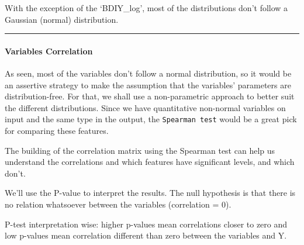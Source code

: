 \documentclass[
]{article}
\begin{document}
With the exception of the `BDIY\_log', most of the distributions don't
follow a Gaussian (normal) distribution.

\begin{center}\rule{0.5\linewidth}{0.5pt}\end{center}

\hypertarget{variables-correlation}{%
\paragraph{Variables Correlation}\label{variables-correlation}}

As seen, most of the variables don't follow a normal distribution, so it
would be an assertive strategy to make the assumption that the
variables' parameters are distribution-free. For that, we shall use a
non-parametric approach to better suit the different distributions.
Since we have quantitative non-normal variables on input and the same
type in the output, the \texttt{Spearman\ test} would be a great pick
for comparing these features.

The building of the correlation matrix using the Spearman test can help
us understand the correlations and which features have significant
levels, and which don't.

We'll use the P-value to interpret the results. The null hypothesis is
that there is no relation whatsoever between the variables (correlation
= 0).

P-test interpretation wise: higher p-values mean correlations closer to
zero and low p-values mean correlation different than zero between the
variables and Y.
\end{document}
